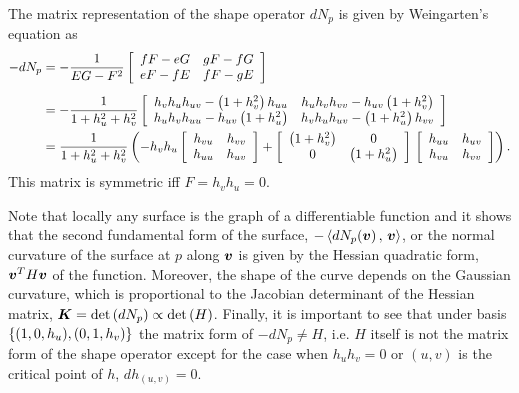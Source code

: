 \documentclass[11pt]{article}
\begin{document}
\begin{enumerate}
\begin{solution}
The matrix representation of the shape operator $dN_{p}$ is given by Weingarten's equation as
\begin{align*}
-dN_{p} &=-\frac{1}{EG-F^{2}}\left[\begin{array}{cc}
fF- eG & gF- fG \\ 
eF- fE & fF - gE
\end{array} \right]\\[5pt]
&= -\frac{1}{1+ h^{2}_{u}+ h^{2}_{v}}
\left[\begin{array}{cc}
h_{v}h_{u}h_{uv}- \left(1+ h^{2}_{v}\right)h_{uu}&  h_{u}h_{v}h_{vv}- h_{uv}\left(1+ h^{2}_{v}\right) \\ 
h_{u}h_{v}h_{uu}- h_{uv}\left(1+ h^{2}_{u}\right)  & h_{v}h_{u}h_{uv}- \left(1+ h^{2}_{u}\right)h_{vv}
\end{array} \right]\\
&= \frac{1}{1+ h^{2}_{u}+ h^{2}_{v}}\left(
-h_{v}h_{u}\left[\begin{array}{cc}
h_{vu}& h_{vv} \\ 
h_{uu}& h_{uv}
\end{array} \right] 
+ \left[\begin{array}{cc}
\left(1+ h^{2}_{v}\right)&   0 \\ 
0 & \left(1+ h^{2}_{u}\right)
\end{array} \right]\,
\left[\begin{array}{cc}
h_{uu}&   h_{uv} \\ 
h_{vu} &  h_{vv}
\end{array} \right]
 \right).
\end{align*}
This matrix is symmetric iff $F = h_{v}h_{u} = 0$. 

Note that locally any surface is the graph of a differentiable function and it shows that the second fundamental form of the surface, $-\left\langle dN_{p}(\boldsymbol{v})\,,\, \boldsymbol{v} \right\rangle$, or the normal curvature of the surface at $p$ along $\boldsymbol{v}$ is given by the Hessian quadratic form, $\boldsymbol{v}^{T}H\boldsymbol{v}$ of the function. Moreover, the shape of the curve depends on the Gaussian curvature, which is proportional to the Jacobian determinant of the Hessian matrix, $\boldsymbol{K} = \det\left(dN_{p}\right) \propto \det\left(H\right)$. Finally, it is important to see that under basis $\left\{(1,0,h_{u}), (0,1,h_{v})\right\}$ the matrix form of $-dN_{p}\neq H$, i.e. $H$ itself is not the matrix form of the shape operator  except for the case when $h_{u}h_{v} = 0$ or $(u,v)$ is the critical point of $h$, $dh_{(u,v)} = 0$. 
\QEDA \\[20pt]
\end{solution}


\end{enumerate}
\end{document}

